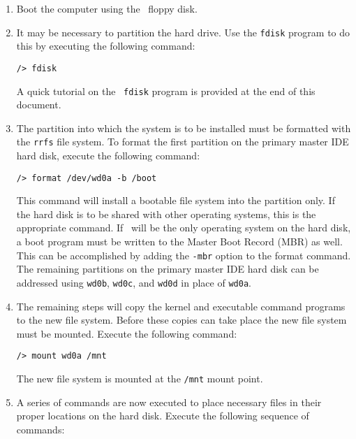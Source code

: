 \begin{enumerate}
\item Boot the computer using the \roadrunner\  floppy disk.

\item It may be necessary to partition the hard drive.  Use the
{\tt fdisk} program to do this by executing the following command:

\begin{verbatim}
/> fdisk
\end{verbatim}

\noindent A quick tutorial on the \roadrunner\  {\tt fdisk} program is
provided at the end of this document.

\item The partition into which the system is to be installed must be
formatted with the {\tt rrfs} file system.  To format the first partition
on the primary master IDE hard disk, execute the following command:

\begin{verbatim}
/> format /dev/wd0a -b /boot
\end{verbatim}

\noindent This command will install a bootable file system into the
partition only.  If the hard disk is to be shared with other operating
systems, this is the appropriate command.  If \roadrunner\  will be the
only operating system on the hard disk, a boot program must be written
to the Master Boot Record (MBR) as well.  This can be accomplished by
adding the {\tt -mbr} option to the format command.  The remaining
partitions on the primary master IDE hard disk can be addressed using
{\tt wd0b}, {\tt wd0c}, and {\tt wd0d} in place of {\tt wd0a}.

\item The remaining steps will copy the kernel and executable command
programs to the new file system.  Before these copies can take place
the new file system must be mounted.  Execute the following command:

\begin{verbatim}
/> mount wd0a /mnt
\end{verbatim}

\noindent The new file system is mounted at the {\tt /mnt} mount point.

\item A series of commands are now executed to place necessary files in
their proper locations on the hard disk.  Execute the following sequence
of commands:


\end{enumerate}
